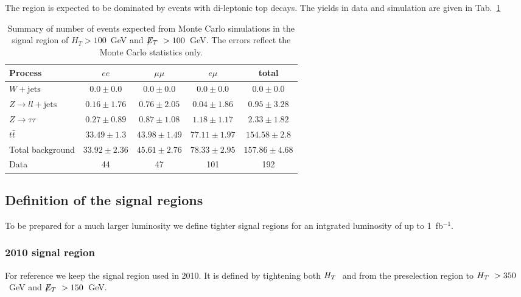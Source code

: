 The region is expected to be dominated by events with di-leptonic
top decays. The yields in data and simulation are given in
Tab.~\ref{tab:presel}

\begin{table}[htb]
\begin{center}
\caption{\label{tab:presel}\protect Summary of number of events expected from Monte Carlo simulations in 
the signal region of $H_T> 100$~GeV and $\displaystyle{\not} E_T~> 100$~GeV. The errors reflect the Monte Carlo statistics only.}
\begin{tabular}{l|ccc|c}
\hline
Process           & $ee$       & $\mu\mu$     & $e\mu$   & total   \\
\hline\hline
$W+\textrm{jets}$ &$0.0 \pm 0.0$&$0.0 \pm 0.0$&$0.0 \pm 0.0$&$0.0 \pm 0.0$\\
$Z\rightarrow ll+\textrm{jets}$&$0.16 \pm 1.76$&$0.76 \pm 2.05$&$0.04 \pm 1.86$&$0.95 \pm 3.28$\\
$Z \rightarrow \tau\tau$&$0.27 \pm 0.89$&$0.87 \pm 1.08$&$1.18 \pm 1.17$&$2.33 \pm 1.82$\\
$t\bar{t}$&$33.49 \pm 1.3$&$43.98 \pm 1.49$&$77.11 \pm 1.97$&$154.58 \pm 2.8$\\
\hline
Total background&$33.92 \pm 2.36$&$45.61 \pm 2.76$&$78.33 \pm 2.95$&$157.86 \pm 4.68$\\\hline
\hline
Data  & 44 & 47 & 101 & 192 \\
\hline\hline
\end{tabular}
\end{center}
\end{table}


\subsection{Definition of the signal regions}

To be prepared for a much larger luminosity we
define tighter signal regions for an
intgrated luminosity of up to 1~fb$^{-1}$.

\subsubsection{2010 signal region}
For reference we keep the signal region used in 2010. It is defined by
tightening both $H_T~$ and \MET from the preselection region
to $H_T~>350$~GeV and $\displaystyle{\not} E_T~>150$~GeV.

